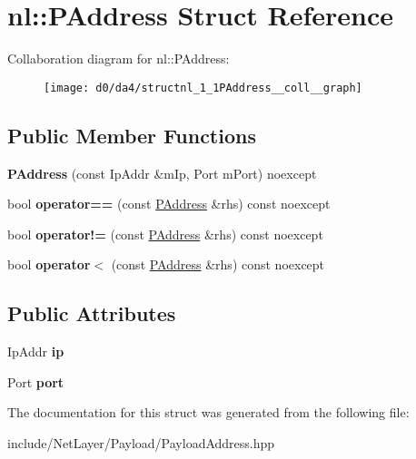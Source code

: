 \hypertarget{structnl_1_1PAddress}{}\section{nl\+:\+:P\+Address Struct Reference}
\label{structnl_1_1PAddress}


Collaboration diagram for nl\+:\+:P\+Address\+:\nopagebreak
\begin{figure}[H]
\begin{center}
\leavevmode
\texttt{[image: d0/da4/structnl\_1\_1PAddress\_\_coll\_\_graph]}
\end{center}
\end{figure}
\subsection*{Public Member Functions}
\begin{DoxyCompactItemize}
\item 
\hypertarget{structnl_1_1PAddress_a3b3d447ae6ae2e5214269c87207c646d}{}{\bfseries P\+Address} (const Ip\+Addr \&m\+Ip, Port m\+Port) noexcept\label{structnl_1_1PAddress_a3b3d447ae6ae2e5214269c87207c646d}

\item 
\hypertarget{structnl_1_1PAddress_aa906da75ec8f742ba39e46937f90dac0}{}bool {\bfseries operator==} (const \hyperlink{structnl_1_1PAddress}{P\+Address} \&rhs) const  noexcept\label{structnl_1_1PAddress_aa906da75ec8f742ba39e46937f90dac0}

\item 
\hypertarget{structnl_1_1PAddress_abed553d216e8203324d5e1d65b79a38f}{}bool {\bfseries operator!=} (const \hyperlink{structnl_1_1PAddress}{P\+Address} \&rhs) const  noexcept\label{structnl_1_1PAddress_abed553d216e8203324d5e1d65b79a38f}

\item 
\hypertarget{structnl_1_1PAddress_ab3e5b075669c046ab457932288bb8ec3}{}bool {\bfseries operator$<$} (const \hyperlink{structnl_1_1PAddress}{P\+Address} \&rhs) const  noexcept\label{structnl_1_1PAddress_ab3e5b075669c046ab457932288bb8ec3}

\end{DoxyCompactItemize}
\subsection*{Public Attributes}
\begin{DoxyCompactItemize}
\item 
\hypertarget{structnl_1_1PAddress_a997be42c475a48bdaca279d6c267ff8f}{}Ip\+Addr {\bfseries ip}\label{structnl_1_1PAddress_a997be42c475a48bdaca279d6c267ff8f}

\item 
\hypertarget{structnl_1_1PAddress_ac7a3e4ddc831aa22676ecd7b7e6041ee}{}Port {\bfseries port}\label{structnl_1_1PAddress_ac7a3e4ddc831aa22676ecd7b7e6041ee}

\end{DoxyCompactItemize}


The documentation for this struct was generated from the following file\+:\begin{DoxyCompactItemize}
\item 
include/\+Net\+Layer/\+Payload/Payload\+Address.\+hpp\end{DoxyCompactItemize}
